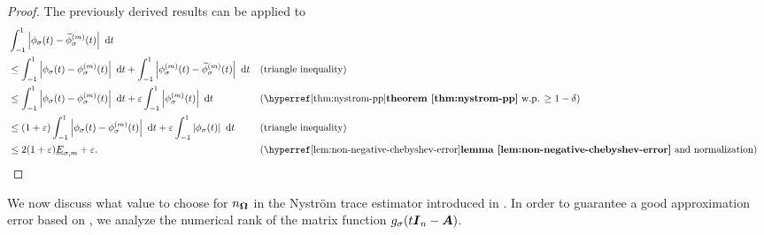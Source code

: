 \documentclass[12pt]{article}
\begin{document}
\begin{proof}
    The previously derived results can be applied to
    \begin{align}
        &\int_{-1}^{1} \left| \phi_{\sigma}(t) - \widetilde{\phi}_{\sigma}^{(m)}(t) \right|~\mathrm{d}t \notag \\
        &\leq \int_{-1}^{1} \left| \phi_{\sigma}(t) - \phi_{\sigma}^{(m)}(t) \right|~\mathrm{d}t + \int_{-1}^{1} \left| \phi^{(m)}_{\sigma}(t) - \widetilde{\phi}_{\sigma}^{(m)}(t) \right|~\mathrm{d}t && \text{(triangle inequality)} \notag \\
        &\leq \int_{-1}^{1} \left| \phi_{\sigma}(t) - \phi_{\sigma}^{(m)}(t) \right|~\mathrm{d}t + \varepsilon \int_{-1}^{1} \left| \phi^{(m)}_{\sigma}(t) \right|~\mathrm{d}t && \text{(\refthm{thm:nystrom-pp} w.p. $\geq 1 - \delta$)} \notag \\
        &\leq (1 + \varepsilon) \int_{-1}^{1} \left| \phi_{\sigma}(t) - \phi_{\sigma}^{(m)}(t) \right|~\mathrm{d}t + \varepsilon \int_{-1}^{1} \left| \phi_{\sigma}(t) \right|~\mathrm{d}t && \text{(triangle inequality)} \notag \\
        &\leq 2 (1 + \varepsilon) \underline{E}_{\sigma, m} + \varepsilon. && \text{(\reflem{lem:non-negative-chebyshev-error} and normalization)} \notag \\
    \end{align}
\end{proof}


We now discuss what value to choose for $n_{\boldsymbol{\Omega}}$ in the Nyström trace estimator introduced in . In order to guarantee a good approximation error based on , we analyze the numerical rank of the matrix function $g_{\sigma}(t\boldsymbol{I}_n - \boldsymbol{A})$.
\end{document}

